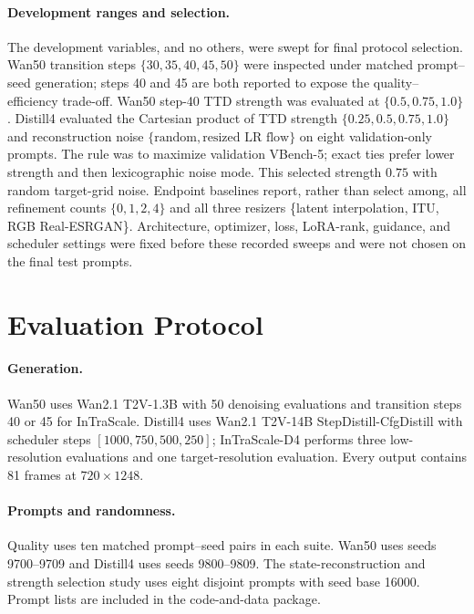 \documentclass[letterpaper]{article}
\begin{document}
\paragraph{Development ranges and selection.}
The development variables, and no others, were swept for final protocol
selection.  Wan50 transition steps \(\{30,35,40,45,50\}\) were inspected under
matched prompt--seed generation; steps 40 and 45 are both reported to expose
the quality--efficiency trade-off.  Wan50 step-40 TTD strength was evaluated at
\(\{0.5,0.75,1.0\}\).  Distill4 evaluated the Cartesian product of TTD strength
\(\{0.25,0.5,0.75,1.0\}\) and reconstruction noise
\(\{\text{random},\text{resized LR flow}\}\) on eight validation-only prompts.
The rule was to maximize validation VBench-5; exact ties prefer lower strength
and then lexicographic noise mode.  This selected strength \(0.75\) with random
target-grid noise.  Endpoint baselines report, rather than select among, all
refinement counts \(\{0,1,2,4\}\) and all three resizers
\{latent interpolation, ITU, RGB Real-ESRGAN\}.  Architecture, optimizer, loss,
LoRA-rank, guidance, and scheduler settings were fixed before these recorded
sweeps and were not chosen on the final test prompts.

\section{Evaluation Protocol}

\paragraph{Generation.}
Wan50 uses Wan2.1 T2V-1.3B with 50 denoising evaluations and transition steps
40 or 45 for InTraScale.  Distill4 uses Wan2.1 T2V-14B
StepDistill-CfgDistill with scheduler steps
\([1000,750,500,250]\); InTraScale-D4 performs three low-resolution
evaluations and one target-resolution evaluation.  Every output contains 81
frames at \(720\times1248\).

\paragraph{Prompts and randomness.}
Quality uses ten matched prompt--seed pairs in each suite.  Wan50 uses seeds
9700--9709 and Distill4 uses seeds 9800--9809.  The state-reconstruction and
strength selection study uses eight disjoint prompts with seed base 16000.
Prompt lists are included in the code-and-data package.
\end{document}
